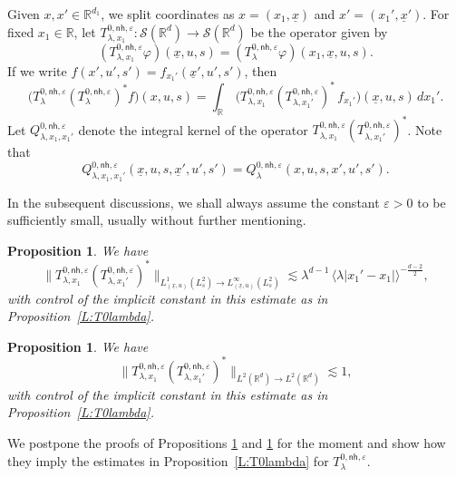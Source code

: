 \documentclass[leqno]{amsart}
\newtheorem{proposition}[theorem]{Proposition}
\theoremstyle{definition}
\theoremstyle{remark}
\numberwithin{equation}{section}
\newcommand{\R}{\mathbb{R}}
\newcommand{\scriptS}{\mathcal{S}}
\newcommand\la{{\lambda}}
\newcommand\ve{{\varepsilon}}
\begin{document}
Given $x,x'\in \R^{d_1}$, we split coordinates as $x = (x_1,\underline x)$ and $x' = (x_1',\underline x')$. For fixed $x_1\in \R$, let $T_{\lambda,x_1}^{0,\mathsf{nh},\varepsilon}:\scriptS(\R^{d})\to \scriptS(\R^{d})$ be the operator given by
\[
(T_{\lambda,x_1}^{0,\mathsf{nh}, \varepsilon} \varphi)(\underline x,u,s) = (T_{\lambda}^{0,\mathsf{nh},\varepsilon} \varphi)(x_1,\underline x,u,s).
\]
If we write $f(x',u',s') = f_{x_1'}(\underline x',u',s')$, then
\begin{equation}\label{eq:x_1-x_1'}
\big(T^{0,\mathsf{nh},\varepsilon}_\la (T^{0,\mathsf{nh},\varepsilon}_\la)^*f\big)(x,u,s) = \int_\R \, \big( T_{\lambda,x_1}^{0,\mathsf{nh},\varepsilon} (T_{\lambda,x_1'}^{0,\mathsf{nh},\varepsilon} )^* \, f_{x_1'}\big) (\underline x,u,s) \, dx_1'.
\end{equation}
Let $Q_{\lambda,x_1,x_1'}^{0,\mathsf{nh},\varepsilon}$ denote the integral kernel of the operator $T_{\lambda,x_1}^{0,\mathsf{nh},\varepsilon} (T_{\lambda,x_1'}^{0,\mathsf{nh},\varepsilon} )^*$. Note that
\begin{equation}\label{eq:frozen-Q}
Q_{\lambda,x_1,x_1'}^{0,\mathsf{nh},\varepsilon}(\underline x,u,s,\underline x',u',s')
= Q_\lambda^{0,\mathsf{nh},\varepsilon}(x,u,s,x',u',s').    
\end{equation}

In the subsequent discussions, we shall always assume  the constant $\ve>0$ to be  sufficiently small, usually without further mentioning.

\begin{proposition}\label{lem:0-L1} 
We have
\[
\|T_{\lambda,x_1}^{0,\mathsf{nh},\varepsilon} (T_{\lambda,x_1'}^{0,\mathsf{nh},\varepsilon} )^* \|_{L_{(\underline x,u)}^{1}(L^2_s)\to L_{(\underline x,u)}^\infty(L^2_s)}
\lesssim \lambda^{d-1} \, \langle\lambda\left|x_1'-x_1\right|\rangle^{-\frac{d-2}{2}} ,
\]
with control of the implicit constant in this estimate as in  Proposition~\ref{L:T0lambda}.
\end{proposition}

\begin{proposition}\label{lem:0-L2}
We have
\[
\|T_{\lambda,x_1}^{0,\mathsf{nh},\varepsilon} (T_{\lambda,x_1'}^{0,\mathsf{nh},\varepsilon} )^*\|_{L^2(\R^{d})\to L^2(\R^{d})} \lesssim 1,
\]
with control of the implicit constant in this estimate as in Proposition~\ref{L:T0lambda}.
\end{proposition}

We postpone the proofs of Propositions \ref{lem:0-L1} and \ref{lem:0-L2} for the moment and show how they imply the estimates in Proposition~\ref{L:T0lambda} for  
$T_\lambda^{0,\mathsf{nh},\varepsilon}$.
\end{document}
